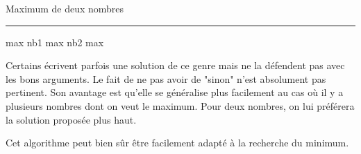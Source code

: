 \begin{Fiche}{Maximum de deux nombres}
	\hfil\rule{0.5\textwidth}{.4pt}\hfil

	\begin{minipage}{7.0cm}
		\begin{LDA}
			\Let max \Gets nb1
				\Let max \Gets nb2
			\EndIf
			\Return max
		\EndAlgo
		\end{LDA}
	\end{minipage}
	\quad
	\begin{minipage}{6.5cm}
		Certains écrivent parfois une solution de ce genre
		mais ne la défendent pas avec les bons arguments.
		Le fait de ne pas avoir de "sinon" n'est absolument pas pertinent.
		Son avantage est qu'elle se généralise plus facilement
		au cas où il y a plusieurs nombres dont on veut le maximum.
		Pour deux nombres, on lui préférera la solution proposée plus haut.
	\end{minipage}
	

	Cet algorithme peut bien sûr être facilement adapté
	à la recherche du minimum.
		
\end{Fiche}
